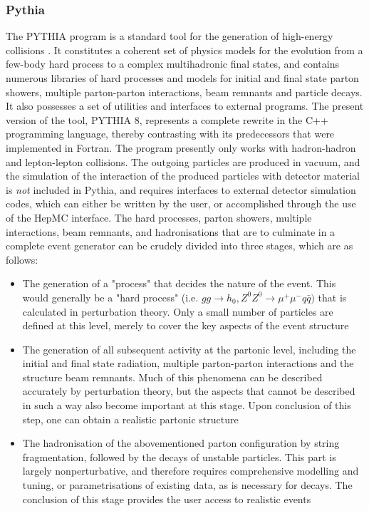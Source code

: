 \subsubsection{Pythia}
The PYTHIA program is a standard tool for the generation of high-energy collisions \cite{SJOSTRAND2015159}. It constitutes a coherent set of
physics models for the evolution from a few-body hard process to a complex multihadronic final states, and contains numerous libraries of 
hard processes and models for initial and final state parton showers, multiple parton-parton interactions, beam remnants and particle decays. It 
also possesses a set of utilities and interfaces to external programs. The present version of the tool, PYTHIA 8, represents a complete rewrite in the C++ programming language, thereby contrasting
with its predecessors that were implemented in Fortran. The program presently only works with hadron-hadron and lepton-lepton collisions. The outgoing particles are produced in vacuum, and the simulation of the interaction of the produced particles with detector material is \textit{not} included in Pythia, and requires interfaces to external detector simulation codes, which can either be written by the user, or accomplished through the use of the HepMC interface. The hard processes, parton showers, multiple interactions,
beam remnants, and hadronisations that are to culminate in a complete event generator can be crudely divided into three stages, which are as follows:
\begin{itemize}
    \item The generation of a "process" that decides the nature of the event. This would generally be a "hard process" (i.e. $gg\rightarrow h_{0}, Z^{0}Z^{0}\rightarrow \mu^{+}\mu^{-} q\bar{q})$ that is calculated in perturbation theory. Only a small number of particles are defined at this level, merely to cover the key aspects of the event structure
    \item The generation of all subsequent activity at the partonic level, including the initial and final state radiation, multiple parton-parton interactions and the structure beam remnants. Much of this phenomena can be described accurately by perturbation theory, but the aspects that cannot be described in such a way also become important at this stage. Upon conclusion of this step, one can obtain a realistic partonic structure
    \item The hadronisation of the abovementioned parton configuration by string fragmentation, followed by the decays of unstable particles. This part is largely nonperturbative, and therefore requires comprehensive modelling and tuning, or parametrisations of existing data, as is necessary for decays. The conclusion of this stage provides the user access to realistic events
\end{itemize}

